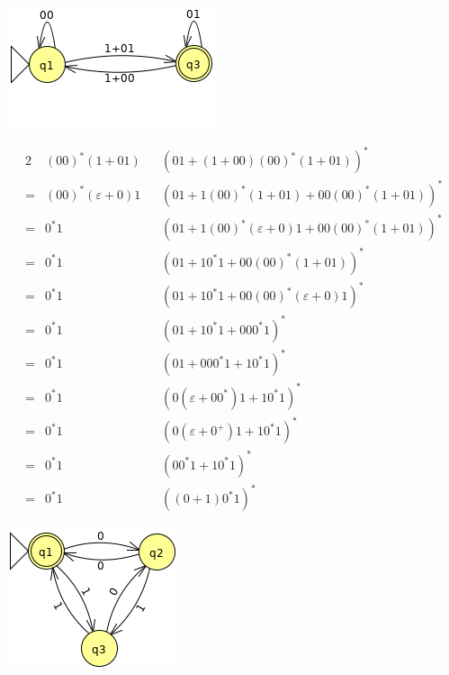 {\begin{center}
\begin{minipage}{0.30\textwidth}
\begin{center}
	\end{center}
	\begin{center} \includegraphics[scale=0.5]{TP05_10_b_2} \end{center}
\end{minipage}%
\begin{minipage}{0.60\textwidth}
	\begin{alignat*}{2}
	 	 & (00)^*(1+01)           &&(01 + (1+00)(00)^*(1+01))^*\\
		=& (00)^*(\varepsilon+0)1 &&(01 + 1(00)^*(1+01)+00(00)^*(1+01))^*\\
		=& 0^*1                   &&(01 + 1(00)^*(\varepsilon+0)1+00(00)^*(1+01))^*\\
		=& 0^*1                   &&(01 + 10^*1+00(00)^*(1+01))^*\\
		=& 0^*1                   &&(01 + 10^*1+00(00)^*(\varepsilon+0)1)^*\\
		=& 0^*1                   &&(01 + 10^*1+000^*1)^*\\
		=& 0^*1                   &&(01 +000^*1 + 10^*1)^*\\
		=& 0^*1                   &&(0(\varepsilon +00^*)1 + 10^*1)^*\\
		=& 0^*1                   &&(0(\varepsilon +0^+)1 + 10^*1)^*\\
		=& 0^*1                   &&(00^*1 + 10^*1)^*\\
		=& 0^*1                   &&((0+1)0^*1)^*
	\end{alignat*}
\end{minipage}
\end{center}
\begin{center}
\begin{minipage}{0.30\textwidth}
	\begin{center} \includegraphics[scale=0.5,trim={0  7mm 0 0}]{TP05_10_b_1_2} \end{center}

\end{minipage}
\end{center}}
